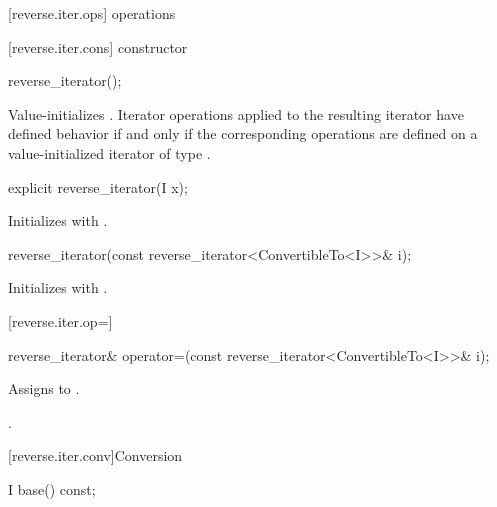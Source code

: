 [reverse.iter.ops]{ operations}

[reverse.iter.cons]{ constructor}

%
\begin{itemdecl}
reverse_iterator();
\end{itemdecl}

\begin{itemdescr}
\pnum
\effects
Value-initializes
.
Iterator operations applied to the resulting iterator have defined behavior
if and only if the corresponding operations are defined on a
value-initialized iterator of type
.
\end{itemdescr}

%
\begin{itemdecl}
explicit reverse_iterator(I x);
\end{itemdecl}

\begin{itemdescr}
\pnum
\effects
Initializes
with .
\end{itemdescr}

%
\begin{itemdecl}
reverse_iterator(const reverse_iterator<ConvertibleTo<I>>& i);
\end{itemdecl}

\begin{itemdescr}
\pnum
\effects
Initializes
with
.
\end{itemdescr}

[reverse.iter.op=]{}

%
\begin{itemdecl}
reverse_iterator&
  operator=(const reverse_iterator<ConvertibleTo<I>>& i);
\end{itemdecl}

\begin{itemdescr}
\pnum
\effects
Assigns  to .

\pnum
\returns
{}.
\end{itemdescr}

[reverse.iter.conv]{Conversion}

%
%
\begin{itemdecl}
I base() const;
\end{itemdecl}

